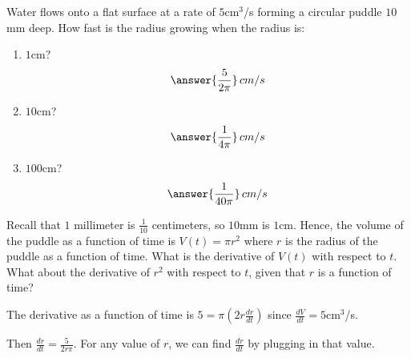 \documentclass{ximera}
\author{Gregory Hartman \and Matthew Carr}
\begin{document}
\begin{exercise}




Water flows onto a flat surface at a rate of $5$cm$^3$/s forming a circular puddle $10$mm deep. How fast is the radius growing when the radius is:
\begin{enumerate}
\item		$1$cm? \[\answer{\frac{5}{2\pi}}\,cm/s\]
\item		$10$cm? \[\answer{\frac{1}{4\pi}}\,cm/s\]
\item		$100$cm? \[\answer{\frac{1}{40\pi}}\,cm/s\]

\end{enumerate}

\begin{hint}
Recall that $1$ millimeter is $\frac{1}{10}$ centimeters, so $10$mm is $1$cm. Hence, the volume of the puddle as a function of time is $V(t)=\pi r^2$ where $r$ is the radius of the puddle as a function of time. What is the derivative of $V(t)$ with respect to $t$. What about the derivative of $r^2$ with respect to $t$, given that $r$ is a function of time?
\end{hint}
\begin{hint}
The derivative as a function of time is $5=\pi(2r\frac{dr}{dt})$ since $\frac{dV}{dt}=5$cm$^3$/s.
\end{hint}
\begin{hint}
Then $\frac{dr}{dt}=\frac{5}{2r\pi}$. For any value of $r$, we can find $\frac{dr}{dt}$ by plugging in that value.
\end{hint}
\end{exercise}
\end{document}
